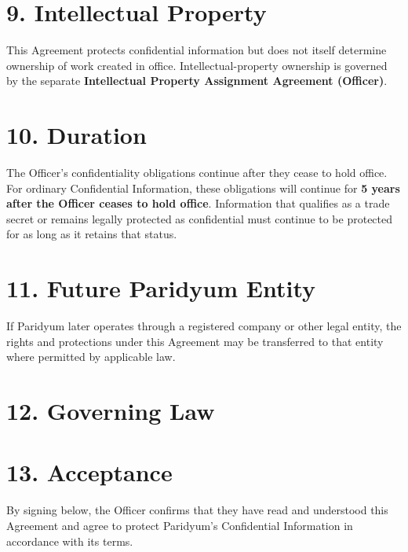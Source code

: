 \documentclass{paridyum}
\begin{document}
\section*{9. Intellectual Property}
This Agreement protects confidential information but does not itself determine
ownership of work created in office. Intellectual-property ownership is governed by
the separate \textbf{Intellectual Property Assignment Agreement (Officer)}.

\section*{10. Duration}
The Officer's confidentiality obligations continue after they cease to hold office.
For ordinary Confidential Information, these obligations will continue for
\textbf{5 years after the Officer ceases to hold office}. Information that qualifies
as a trade secret or remains legally protected as confidential must continue to be
protected for as long as it retains that status.

\section*{11. Future Paridyum Entity}
If Paridyum later operates through a registered company or other legal entity, the
rights and protections under this Agreement may be transferred to that entity where
permitted by applicable law.

\section*{12. Governing Law}


\section*{13. Acceptance}
By signing below, the Officer confirms that they have read and understood this
Agreement and agree to protect Paridyum's Confidential Information in accordance
with its terms.

\vspace{1.5em}
\paridyumsignblock

\vspace{1.5em}
\end{document}
